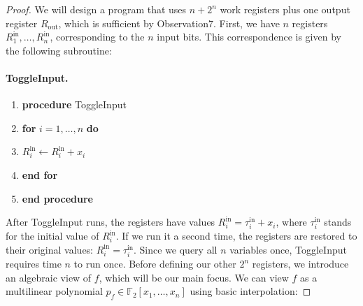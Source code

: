 \begin{proof}
We will design a program that uses $n+2^n$ work registers plus one output register $R_{\mathrm{out}}$, which is sufficient by Observation7. First, we have $n$ registers $R^{\mathrm{in}}_1,\ldots,R^{\mathrm{in}}_n$, corresponding to the $n$ input bits. This correspondence is given by the following subroutine:
\paragraph{ToggleInput.}
\begin{enumerate}[label=\arabic*:]
\item \textbf{procedure} ToggleInput
\item \textbf{for} $i=1,\ldots,n$ \textbf{do}
\item $R_i^{\mathrm{in}}\leftarrow R_i^{\mathrm{in}}+x_i$
\item \textbf{end for}
\item \textbf{end procedure}
\end{enumerate}
After ToggleInput runs, the registers have values $R_i^{\mathrm{in}}=\tau_i^{\mathrm{in}}+x_i$, where $\tau_i^{\mathrm{in}}$ stands for the initial value of $R_i^{\mathrm{in}}$. If we run it a second time, the registers are restored to their original values: $R_i^{\mathrm{in}}=\tau_i^{\mathrm{in}}$. Since we query all $n$ variables once, ToggleInput requires time $n$ to run once.
Before defining our other $2^n$ registers, we introduce an algebraic view of $f$, which will be our main focus. We can view $f$ as a multilinear polynomial $p_f\in\mathbb F_2[x_1,\ldots,x_n]$ using basic interpolation:

\end{proof}
